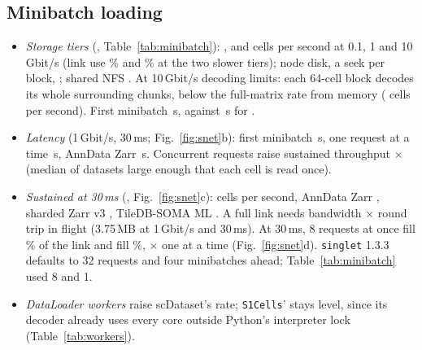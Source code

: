 \subsection{Minibatch loading}
\begin{itemize}\itemsep 1pt
\item \emph{Storage tiers} (, Table~\ref{tab:minibatch}): ,
   and  cells per second at 0.1, 1 and 10\,Gbit/s (link use
  \% and \% at the two slower tiers); node disk, a seek per block,
  ; shared NFS . At 10\,Gbit/s decoding limits: each 64-cell block decodes
  its whole surrounding chunks, below the full-matrix rate from memory ( cells per second).
  First minibatch \,s, against \,s for .
\item \emph{Latency} (1\,Gbit/s, 30\,ms; Fig.~\ref{fig:snet}b): first minibatch \,s, one request
  at a time \,s, AnnData Zarr \,s. Concurrent requests raise
  sustained throughput $\times$ (median of  datasets
  large enough that each cell is read once).
\item \emph{Sustained at 30\,ms} (, Fig.~\ref{fig:snet}c): \sone{}  cells per
  second, AnnData Zarr , sharded Zarr v3 , TileDB-SOMA ML
  . A full link needs bandwidth $\times$ round trip in flight (3.75\,MB at 1\,Gbit/s and
  30\,ms). At 30\,ms, 8 requests at once fill \% of the link and  fill
  \%, $\times$ one at a time (Fig.~\ref{fig:snet}d). \texttt{singlet} 1.3.3
  defaults to 32 requests and four minibatches ahead; Table~\ref{tab:minibatch} used 8 and 1.
\item \emph{DataLoader workers} raise scDataset's rate; \texttt{S1Cells}' stays level, since its decoder already uses
  every core outside Python's interpreter lock (Table~\ref{tab:workers}).
\end{itemize}

